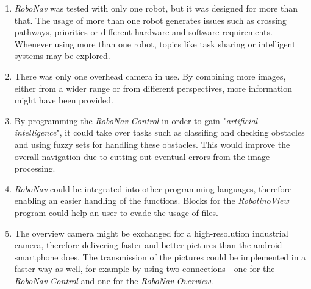 \begin{enumerate}
\item \textit{RoboNav} was tested with only one robot, but it was designed for more than that. The usage of more than one robot generates issues such as crossing pathways, priorities or different hardware and software requirements. \\ Whenever using more than one robot, topics like task sharing or intelligent systems may be explored. 
\item  There was only one overhead camera in use. By combining more images, either from a wider range or from different perspectives, more information might have been provided.
\item By programming the \textit{RoboNav Control} in order to gain "\textit{artificial intelligence}", it could take over tasks such as classifing and checking obstacles and using fuzzy sets for handling these obstacles. This would improve the overall navigation due to cutting out eventual errors from the image processing.   
\item \textit{RoboNav} could be integrated into other programming languages, therefore enabling an easier handling of the functions. Blocks for the \textit{RobotinoView} program could help an user to evade the usage of files.
\item The overview camera might be exchanged for a high-resolution industrial camera, therefore delivering faster and better pictures than the android smartphone does. The transmission of the pictures could be implemented in a faster way as well, for example by using two connections - one for the \textit{RoboNav Control} and one for the \textit{RoboNav Overview}. 
\end{enumerate} 

